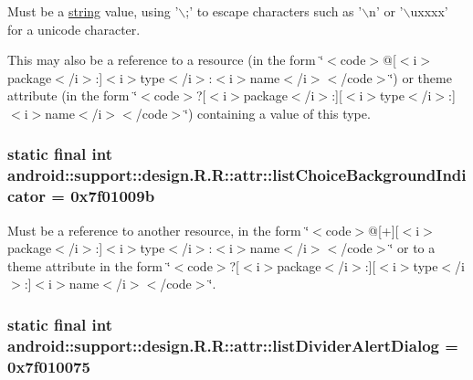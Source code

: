 Must be a \hyperlink{classandroid_1_1support_1_1design_1_1_r_1_1string}{string} value, using '$\backslash$;' to escape characters such as '$\backslash$n' or '$\backslash$uxxxx' for a unicode character. 

This may also be a reference to a resource (in the form \char`\"{}$<$code$>$@\mbox{[}$<$i$>$package$<$/i$>$:\mbox{]}$<$i$>$type$<$/i$>$:$<$i$>$name$<$/i$>$$<$/code$>$\char`\"{}) or theme attribute (in the form \char`\"{}$<$code$>$?\mbox{[}$<$i$>$package$<$/i$>$:\mbox{]}\mbox{[}$<$i$>$type$<$/i$>$:\mbox{]}$<$i$>$name$<$/i$>$$<$/code$>$\char`\"{}) containing a value of this type. \hypertarget{classandroid_1_1support_1_1design_1_1_r_1_1attr_124eb4ccadb82f9c5bb68d9a1bd896a9}{
\subsubsection[{listChoiceBackgroundIndicator}]{\setlength{\rightskip}{0pt plus 5cm}static final int android::support::design.R.R::attr::listChoiceBackgroundIndicator = 0x7f01009b}}
\label{classandroid_1_1support_1_1design_1_1_r_1_1attr_124eb4ccadb82f9c5bb68d9a1bd896a9}


Must be a reference to another resource, in the form \char`\"{}$<$code$>$@\mbox{[}+\mbox{]}\mbox{[}$<$i$>$package$<$/i$>$:\mbox{]}$<$i$>$type$<$/i$>$:$<$i$>$name$<$/i$>$$<$/code$>$\char`\"{} or to a theme attribute in the form \char`\"{}$<$code$>$?\mbox{[}$<$i$>$package$<$/i$>$:\mbox{]}\mbox{[}$<$i$>$type$<$/i$>$:\mbox{]}$<$i$>$name$<$/i$>$$<$/code$>$\char`\"{}. \hypertarget{classandroid_1_1support_1_1design_1_1_r_1_1attr_eeb5db86c85c77f3056bc6e1065f2bd3}{
\subsubsection[{listDividerAlertDialog}]{\setlength{\rightskip}{0pt plus 5cm}static final int android::support::design.R.R::attr::listDividerAlertDialog = 0x7f010075}}
\label{classandroid_1_1support_1_1design_1_1_r_1_1attr_eeb5db86c85c77f3056bc6e1065f2bd3}


